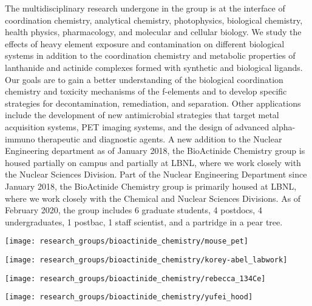 \begin{minipage}{0.7\textwidth}
	The multidisciplinary research undergone in the group is at the interface of coordination chemistry, analytical chemistry, photophysics, biological chemistry, health physics, pharmacology, and molecular and cellular biology. 
	We study the effects of heavy element exposure and contamination on different biological systems in addition to the coordination chemistry and metabolic properties of lanthanide and actinide complexes formed with synthetic and biological ligands. 
	Our goals are to gain a better understanding of the biological coordination chemistry and toxicity mechanisms of the f-elements and to develop specific strategies for decontamination, remediation, and separation. 
	Other applications include the development of new antimicrobial strategies that target metal acquisition systems, PET imaging systems, and the design of advanced alpha-immuno therapeutic and diagnostic agents. 
	A new addition to the Nuclear Engineering department as of January 2018, the BioActinide Chemistry group is housed partially on campus and partially at LBNL, where we work closely with the Nuclear Sciences Division. 
	Part of the Nuclear Engineering Department since January 2018, the BioActinide Chemistry group is primarily housed at LBNL, where we work closely with the Chemical and Nuclear Sciences Divisions.
	As of February 2020, the group includes 6 graduate students, 4 postdocs, 4 undergraduates, 1 postbac, 1 staff scientist, and a partridge in a pear tree.
\end{minipage}
\begin{minipage}{0.3\textwidth}
	\texttt{[image: research\_groups/bioactinide\_chemistry/mouse\_pet]}
\end{minipage}

\vspace{0.5cm}
\begin{minipage}{0.40\textwidth}
	\begin{center}
		\texttt{[image: research\_groups/bioactinide\_chemistry/korey-abel\_labwork]}
	\end{center}
\end{minipage}
\begin{minipage}{0.33\textwidth}
	\begin{center}
		\texttt{[image: research\_groups/bioactinide\_chemistry/rebecca\_134Ce]}
	\end{center}
\end{minipage}
\begin{minipage}{0.17\textwidth}
	\begin{center}
		\texttt{[image: research\_groups/bioactinide\_chemistry/yufei\_hood]}
	\end{center}
\end{minipage}

